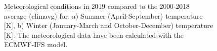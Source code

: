 \begin{figure}[h]
  \caption{Meteorological conditions in 2019 compared to the 2000-2018 average (climavg) for: a) Summer (April-September) temperature [K], b) Winter (January-March and October-December) temperature [K]. The meteorological data have been calculated with the ECMWF-IFS model.} 
\label{fig:temp-avMET}
\end{figure}

